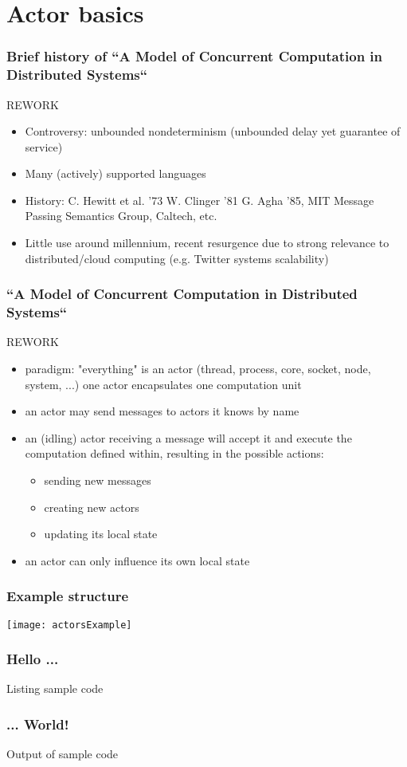 \section{Actor basics}
\begin{frame}
\frametitle{Brief history of ``A Model of Concurrent Computation in Distributed Systems``}
REWORK
\begin{itemize}
\item Controversy: unbounded nondeterminism (unbounded delay yet guarantee of service)
\item Many (actively) supported languages
\item History: C. Hewitt et al. '73 \textrightarrow{} W. Clinger '81 \textrightarrow{} G. Agha '85, MIT Message Passing Semantics Group, Caltech, etc.
\item Little use around millennium, recent resurgence due to strong relevance to distributed/cloud computing (e.g. Twitter systems scalability)
\end{itemize}
\end{frame}

\begin{frame}
\frametitle{``A Model of Concurrent Computation in Distributed Systems``}
REWORK
\begin{itemize}
\item paradigm: "everything" is an actor (thread, process, core, socket, node, system, ...) \textrightarrow{} one actor encapsulates one computation unit
\item an actor may send messages to actors it knows by name
\item an (idling) actor receiving a message will accept it and execute the computation defined within, resulting in the possible actions:
	\begin{itemize}
	\item sending new messages
	\item creating new actors
	\item updating its local state
	\end{itemize}
\item an actor can only influence its own local state
\end{itemize}
\end{frame}

\begin{frame}
\frametitle{Example structure}
	\texttt{[image: actorsExample]}
\end{frame}

\begin{frame}
\frametitle{Hello ...}
Listing sample code
\end{frame}

\begin{frame}
\frametitle{... World!}
Output of sample code
\end{frame}